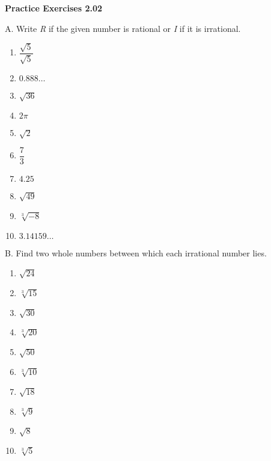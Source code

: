 \vspace{0.3ex}
\noindent\textbf{Practice Exercises 2.02}

\vspace{0.2ex}

A. Write \emph{R} if the given number is rational or \emph{I} if it is irrational.
\begin{multicols}{2}
\begin{enumerate}[noitemsep, label = \color{blue}\arabic*. ]
\item \(\dfrac{\sqrt{5}}{\sqrt{5}}\)
\item \(0.888\ldots\)
\item \(\sqrt{36}\)
\item \(2\pi\)
\item \(\sqrt{2}\)
\item \(\dfrac{7}{3}\)
\item \(4.25\)
\item \(\sqrt{49}\)
\item \(\sqrt[{\scriptstyle 3}]{-8}\)
\item \(3.14159\ldots\)  
\end{enumerate}
\end{multicols}

B. Find two whole numbers between which each irrational number lies.
\begin{multicols}{2}
\begin{enumerate}[noitemsep, label = \color{blue}\arabic*. ]
\item \(\sqrt{24}\)
\item \(\sqrt[3]{15}\)
\item \(\sqrt{30}\)
\item \(\sqrt[3]{20}\)
\item \(\sqrt{50}\)
\item \(\sqrt[3]{10}\)
\item \(\sqrt{18}\)
\item \(\sqrt[3]{9}\)
\item \(\sqrt{8}\)
\item \(\sqrt[3]{5}\)
\end{enumerate}
\end{multicols}
